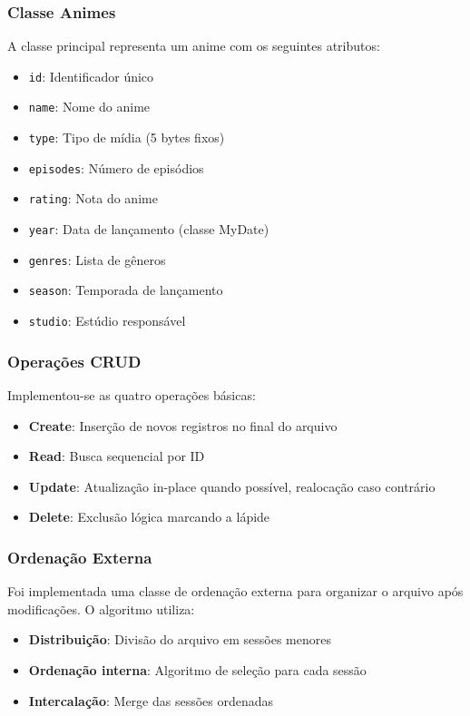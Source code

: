 \documentclass[12pt,a4paper]{article}
\begin{document}
\subsubsection{Classe Animes}

A classe principal representa um anime com os seguintes atributos:
\begin{itemize}
    \item \texttt{id}: Identificador único
    \item \texttt{name}: Nome do anime
    \item \texttt{type}: Tipo de mídia (5 bytes fixos)
    \item \texttt{episodes}: Número de episódios
    \item \texttt{rating}: Nota do anime
    \item \texttt{year}: Data de lançamento (classe MyDate)
    \item \texttt{genres}: Lista de gêneros
    \item \texttt{season}: Temporada de lançamento
    \item \texttt{studio}: Estúdio responsável
\end{itemize}

\subsubsection{Operações CRUD}

Implementou-se as quatro operações básicas:
\begin{itemize}
    \item \textbf{Create}: Inserção de novos registros no final do arquivo
    \item \textbf{Read}: Busca sequencial por ID
    \item \textbf{Update}: Atualização in-place quando possível, realocação caso contrário
    \item \textbf{Delete}: Exclusão lógica marcando a lápide
\end{itemize}

\subsubsection{Ordenação Externa}

Foi implementada uma classe de ordenação externa para organizar o arquivo após modificações. O algoritmo utiliza:
\begin{itemize}
    \item \textbf{Distribuição}: Divisão do arquivo em sessões menores
    \item \textbf{Ordenação interna}: Algoritmo de seleção para cada sessão
    \item \textbf{Intercalação}: Merge das sessões ordenadas
\end{itemize}
\end{document}
